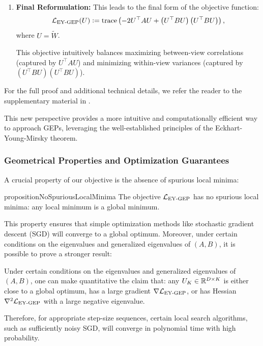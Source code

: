 \begin{enumerate}
    \item \textbf{Final Reformulation:} This leads to the final form of the objective function:
    \[
    \mathcal{L}_\text{EY-GEP}(U) \vcentcolon= \operatorname{trace} \left( - 2U^\top A U + \left(U^\top B U\right) \left(U^\top B U\right) \right),
    \]
    where \(U = \tilde{W}\).

    This objective intuitively balances maximizing between-view correlations (captured by \(U^\top A U\)) and minimizing within-view variances (captured by \((U^\top B U)(U^\top B U)\)).
\end{enumerate}


For the full proof and additional technical details, we refer the reader to the supplementary material in \citet{chapman2023efficient}.

This new perspective provides a more intuitive and computationally efficient way to approach GEPs, leveraging the well-established principles of the Eckhart-Young-Mirsky theorem.

\subsubsection{Geometrical Properties and Optimization Guarantees}
A crucial property of our objective is the absence of spurious local minima:

\begin{restatable}{proposition}{NoSpuriousLocalMinima}\label{prop:no-spurious}
The objective $\mathcal{L}_\text{EY-GEP}$ has no spurious local minima: any local minimum is a global minimum.
\end{restatable}

This property ensures that simple optimization methods like stochastic gradient descent (SGD) will converge to a global optimum. Moreover, under certain conditions on the eigenvalues and generalized eigenvalues of $(A,B)$, it is possible to prove a stronger result:
\begin{corollary}
    Under certain conditions on the eigenvalues and generalized eigenvalues of $(A,B)$, one can make quantitative the claim that:
    any $U_K \in \mathbb{R}^{D \times K}$ is either close to a global optimum, has a large gradient $\nabla \mathcal{L}_\text{EY-GEP}$, or has Hessian $\nabla^2 \mathcal{L}_\text{EY-GEP}$ with a large negative eigenvalue.
    
    Therefore, for appropriate step-size sequences, certain local search algorithms, such as sufficiently noisy SGD, will converge in polynomial time with high probability.
\end{corollary}
